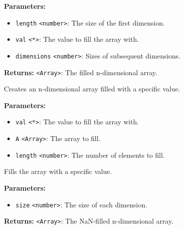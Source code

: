 \documentclass[12pt,a4paper]{article}
\begin{document}
\vspace{5mm}
\noindent {}


\noindent \textbf{Parameters:}
\begin{itemize}
  \item \texttt{length} \texttt{<number>}: The size of the first dimension.
  \item \texttt{val} \texttt{<*>}: The value to fill the array with.
  \item \texttt{dimensions} \texttt{<number>}: Sizes of subsequent dimensions.
\end{itemize}

\noindent \textbf{Returns:} \texttt{<Array>}: The filled n-dimensional array.

\noindent Creates an n-dimensional array filled with a specific value.

\vspace{5mm}
\noindent {}


\noindent \textbf{Parameters:}
\begin{itemize}
  \item \texttt{val} \texttt{<*>}: The value to fill the array with.
  \item \texttt{A} \texttt{<Array>}: The array to fill.
  \item \texttt{length} \texttt{<number>}: The number of elements to fill.
\end{itemize}

\noindent Fills the array with a specific value.

\vspace{5mm}
\noindent {}


\noindent \textbf{Parameters:}
\begin{itemize}
  \item \texttt{size} \texttt{<number>}: The size of each dimension.
\end{itemize}

\noindent \textbf{Returns:} \texttt{<Array>}: The NaN-filled n-dimensional array.
\end{document}
